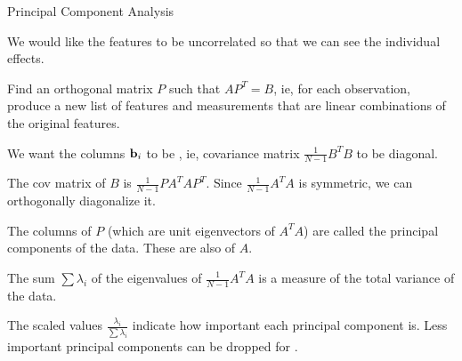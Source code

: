 \documentclass[xcolor=dvipsnames,aspectratio=169,t]{beamer}
\begin{document}
\begin{frame}{Principal Component Analysis}
  \smallskip
  
  We would like the features to be uncorrelated so that we can see the individual effects.
  \medskip
  
  \pause
  Find an orthogonal matrix $P$ such that $AP^T=B$,
  ie, for each observation, produce a new list of features and measurements that are linear combinations of the original features.
  \medskip
  
  We want the columns $\mathbf{b}_i$ to be ,
  \pause
  ie, covariance matrix $\frac{1}{N-1} B^T B$ to be \alert{diagonal}.
  \medskip
  
  The cov matrix of $B$ is $\frac{1}{N-1} P A^T A P^T$.  Since $\frac{1}{N-1} A^T A$ is \alert{symmetric}, we can orthogonally diagonalize it.
  \medskip
  
  The columns of $P$ (which are unit eigenvectors of $A^T A$) are called the \alert{principal components} of the data.  These are also  of $A$.
  \bigskip
  
  \pause
  The sum $\sum \lambda_i$ of the eigenvalues of $\frac{1}{N-1} A^T A$ is a measure of the total variance of the data.
  \medskip
  
  The scaled values $\frac{\lambda_i}{\sum \lambda_i}$ indicate how important each principal component is.  Less important principal components can be dropped for .
\end{frame}
\end{document}
